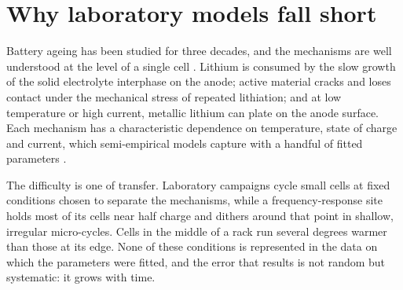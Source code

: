 \section{Why laboratory models fall short}
\label{sec:lab}

Battery ageing has been studied for three decades, and the mechanisms are
well understood at the level of a single cell
\parencite{birkl2017degradation}. Lithium is consumed by the slow growth
of the solid electrolyte interphase on the anode; active material
cracks and loses contact under the mechanical stress of repeated
lithiation; and at low temperature or high current, metallic lithium can
plate on the anode surface. Each mechanism has a characteristic
dependence on temperature, state of charge and current, which
semi-empirical models capture with a handful of fitted parameters
\parencite{schmalstieg2014holistic}.

The difficulty is one of transfer. Laboratory campaigns cycle small
cells at fixed conditions chosen to separate the mechanisms, while a
frequency-response site holds most of its cells near half charge and
dithers around that point in shallow, irregular micro-cycles. Cells in
the middle of a rack run several degrees warmer than those at its edge.
None of these conditions is represented in the data on which the
parameters were fitted, and the error that results is not random but
systematic: it grows with time.

\begin{figure}[tb]
\end{figure}

